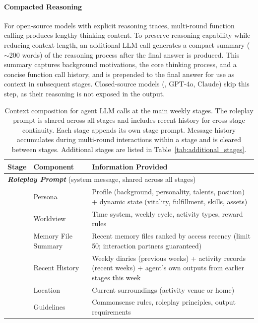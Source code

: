 \paragraph{Compacted Reasoning}
For open-source models with explicit reasoning traces, multi-round function calling produces lengthy thinking content.
To preserve reasoning capability while reducing context length, an additional LLM call generates a compact summary ($\sim$200 words) of the reasoning process after the final answer is produced.
This summary captures background motivations, the core thinking process, and a concise function call history, and is prepended to the final answer for use as context in subsequent stages.
Closed-source models (\eg, GPT-4o, Claude) skip this step, as their reasoning is not exposed in the output.

\begin{table}[htbp]
  \centering
  \caption{Context composition for agent LLM calls at the main weekly stages. The roleplay prompt is shared across all stages and includes recent history for cross-stage continuity. Each stage appends its own stage prompt. Message history accumulates during multi-round interactions within a stage and is cleared between stages. Additional stages are listed in Table~\ref{tab:additional_stages}.}
  \label{tab:context_management}
  \small
  \begin{tabular}{p{2.0cm} p{3.0cm} p{8.0cm}}
    \toprule
    \textbf{Stage} & \textbf{Component} & \textbf{Information Provided} \\
    \midrule
    \multicolumn{3}{l}{\textbf{\textit{Roleplay Prompt}} {\scriptsize (system message, shared across all stages)}} \\
    \midrule
      & Persona          & Profile (background, personality, talents, position) + dynamic state (vitality, fulfillment, skills, assets) \\
      & Worldview        & Time system, weekly cycle, activity types, reward rules \\
      & Memory File Summary & Recent memory files ranked by access recency (limit 50; interaction partners guaranteed) \\
      & Recent History   & Weekly diaries (previous weeks) + activity records (recent weeks) + agent's own outputs from earlier stages this week \\
      & Location         & Current surroundings (activity venue or home) \\
      & Guidelines       & Commonsense rules, roleplay principles, output requirements \\

\end{tabular}
\end{table}
